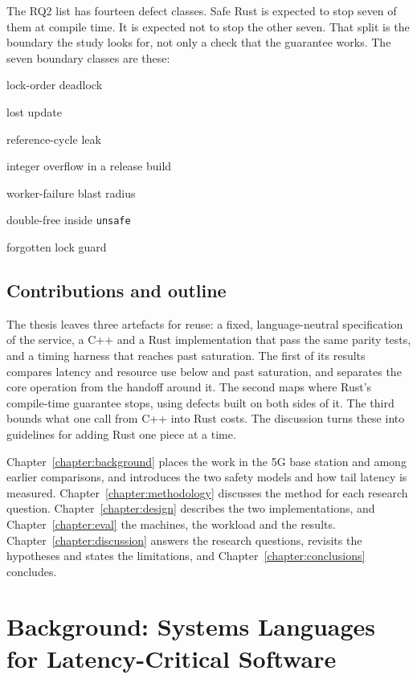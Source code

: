 \documentclass[english,oneside,a4paper,censored,csm,software-track-2020]{HYthesisML}
\begin{document}
The RQ2 list has fourteen defect classes. Safe Rust is expected to stop seven of
them at compile time. It is expected not to stop the other seven. That split is
the boundary the study looks for, not only a check that the guarantee works. The seven
boundary classes are these:
\begin{compactitem}
\item lock-order deadlock
\item lost update
\item reference-cycle leak
\item integer overflow in a release build
\item worker-failure blast radius
\item double-free inside \texttt{unsafe}
\item forgotten lock guard
\end{compactitem}

\section{Contributions and outline}\label{sec:contrib}
The thesis leaves three artefacts for reuse: a fixed, language-neutral specification of the
service, a C++ and a Rust implementation that pass the same parity tests, and a timing
harness that reaches past saturation. The first of its results compares latency and resource
use below and past saturation, and separates the core operation from the handoff around it.
The second maps where Rust's compile-time guarantee stops, using defects built on both sides
of it. The third bounds what one call from C++ into Rust costs. The discussion turns these
into guidelines for adding Rust one piece at a time.

Chapter~\ref{chapter:background} places the work in the 5G base station and among earlier
comparisons, and introduces the two safety models and how tail latency is measured.
Chapter~\ref{chapter:methodology} discusses the method for each research question.
Chapter~\ref{chapter:design} describes the two implementations, and Chapter~\ref{chapter:eval}
the machines, the workload and the results. Chapter~\ref{chapter:discussion} answers the
research questions, revisits the hypotheses and states the limitations, and
Chapter~\ref{chapter:conclusions} concludes.

\chapter{Background: Systems Languages for Latency-Critical Software\label{chapter:background}}
\end{document}
